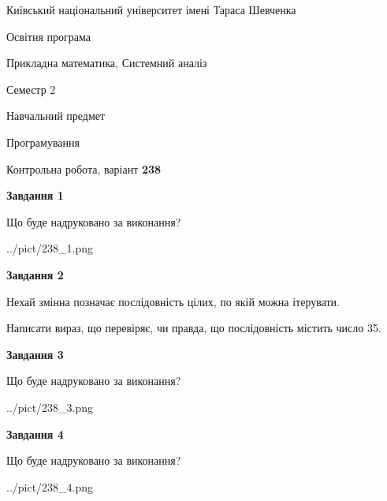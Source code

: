 \documentclass[12pt, ukrainian]{article}
\begin{document}
{{\begin {small}\par
{ \center  Київський національний університет імені Тараса Шевченка \par}
{\parbox {5 cm}{Освітня програма \hfill}{\parbox {8 cm}{Прикладна математика, Системний аналіз \hfill}}\parbox {5 cm}{\hfill Семестр 2}}\par
{\parbox {5 cm} {Навчальний предмет \hfill}\parbox {7 cm}{Програмування \hfill}\parbox {6cm}{\hfill}\par}\vspace{-7pt} \end{small}}{\center Контрольна робота, варіант  \No \textbf
{ 238 }\par}}
{
\begin {large}
{\begin {center}\textbf{Завдання 1}\end {center}}\par
Що буде надруковано за виконання?\par\par
\begin{center}
	{../pict/238_1.png}
\end{center}
\newpage

{\begin {center}\textbf{Завдання 2}\end {center}}\par
Нехай змінна  позначає послідовність цілих, по якій можна ітерувати.

Написати вираз, що перевіряє, чи правда, що послідовність  містить число 35.\par
\newpage

{\begin {center}\textbf{Завдання 3}\end {center}}\par
Що буде надруковано за виконання?
\begin{center}
	{../pict/238_3.png}
\end{center}
\newpage

{\begin {center}\textbf{Завдання 4}\end {center}}\par
Що буде надруковано за виконання?\par
\begin{center}
	{../pict/238_4.png}
\end{center}
\newpage


\end{large}}
\end{document}
